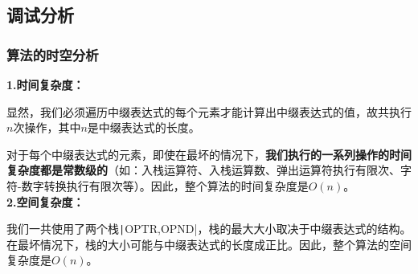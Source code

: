 \documentclass[10pt,a4paper]{article}
\begin{document}
	\subsection{调试分析}
	\subsubsection{算法的时空分析}
	\noindent \textbf{1.时间复杂度：}
	
	显然，我们必须遍历中缀表达式的每个元素才能计算出中缀表达式的值，故共执行$n$次操作，其中$n$是中缀表达式的长度。
	
	对于每个中缀表达式的元素，即使在最坏的情况下，\textbf{我们执行的一系列操作的时间复杂度都是常数级的}（如：入栈运算符、入栈运算数、弹出运算符执行有限次、字符-数字转换执行有限次等）。因此，整个算法的时间复杂度是$O(n)$。\\
	
	\noindent \textbf{2.空间复杂度：}
	
	我们一共使用了两个栈\texttt|OPTR,OPND|，栈的最大大小取决于中缀表达式的结构。在最坏情况下，栈的大小可能与中缀表达式的长度成正比。因此，整个算法的空间复杂度是$O(n)$。
	
	\newpage
\end{document}
